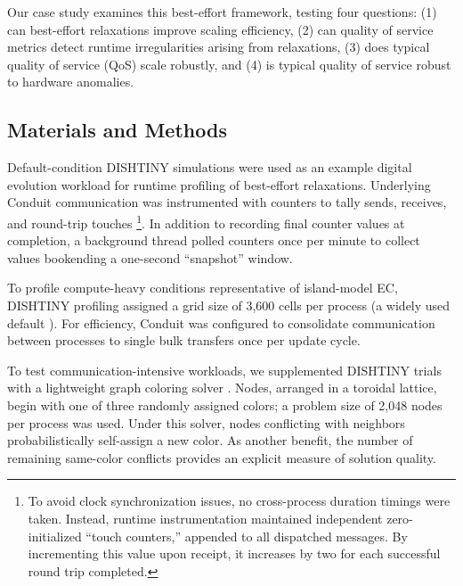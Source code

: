 Our case study examines this best-effort framework, testing four questions: (1) can best-effort relaxations improve scaling efficiency, (2) can quality of service metrics detect runtime irregularities arising from relaxations, (3) does typical quality of service (QoS) scale robustly, and (4) is typical quality of service robust to hardware anomalies.

\vspace{-4.0ex}
\subsection{Materials and Methods}
\label{moreno:sec:case1:design}
\vspace{-2.0ex}

Default-condition DISHTINY simulations were used as an example digital evolution workload for runtime profiling of best-effort relaxations.
Underlying Conduit communication was instrumented with counters to tally sends, receives, and round-trip touches
\unskip\footnote{%
To avoid clock synchronization issues, no cross-process duration timings were taken.
Instead, runtime instrumentation maintained independent zero-initialized ``touch counters,'' appended to all dispatched messages.
By incrementing this value upon receipt, it increases by two for each successful round trip completed.
}.
In addition to recording final counter values at completion, a background thread polled counters once per minute to collect values bookending a one-second ``snapshot'' window.

To profile compute-heavy conditions representative of island-model EC, DISHTINY profiling assigned a grid size of 3{\small,}600 cells per process (a widely used default \cite{ofria2004avida}).
For efficiency, Conduit was configured to consolidate communication between processes to single bulk transfers once per update cycle.

To test communication-intensive workloads, we supplemented DISHTINY trials with a lightweight graph coloring solver \cite{leith2012wlan}.
Nodes, arranged in a toroidal lattice, begin with one of three randomly assigned colors; a problem size of 2{\small,}048 nodes per process was used.
Under this solver, nodes conflicting with neighbors probabilistically self-assign a new color.
As another benefit, the number of remaining same-color conflicts provides an explicit measure of solution quality.

